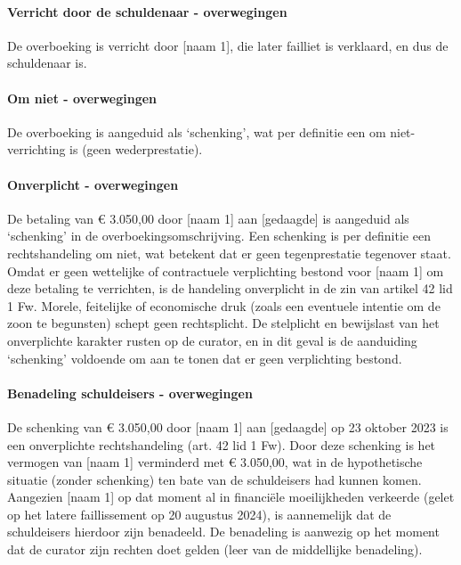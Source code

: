 \documentclass[
  dutch,
  a4paper,
]{article}
\begin{document}
\paragraph{Verricht door de schuldenaar - overwegingen}\label{verricht-door-de-schuldenaar---overwegingen-33}

De overboeking is verricht door {[}naam 1{]}, die later failliet is verklaard, en dus de schuldenaar is.

\paragraph{Om niet - overwegingen}\label{om-niet---overwegingen-33}

De overboeking is aangeduid als `schenking', wat per definitie een om niet-verrichting is (geen wederprestatie).

\paragraph{Onverplicht - overwegingen}\label{onverplicht---overwegingen-33}

De betaling van € 3.050,00 door {[}naam 1{]} aan {[}gedaagde{]} is aangeduid als `schenking' in de overboekingsomschrijving. Een schenking is per definitie een rechtshandeling om niet, wat betekent dat er geen tegenprestatie tegenover staat. Omdat er geen wettelijke of contractuele verplichting bestond voor {[}naam 1{]} om deze betaling te verrichten, is de handeling onverplicht in de zin van artikel 42 lid 1 Fw. Morele, feitelijke of economische druk (zoals een eventuele intentie om de zoon te begunsten) schept geen rechtsplicht. De stelplicht en bewijslast van het onverplichte karakter rusten op de curator, en in dit geval is de aanduiding `schenking' voldoende om aan te tonen dat er geen verplichting bestond.

\paragraph{Benadeling schuldeisers - overwegingen}\label{benadeling-schuldeisers---overwegingen-33}

De schenking van € 3.050,00 door {[}naam 1{]} aan {[}gedaagde{]} op 23 oktober 2023 is een onverplichte rechtshandeling (art. 42 lid 1 Fw). Door deze schenking is het vermogen van {[}naam 1{]} verminderd met € 3.050,00, wat in de hypothetische situatie (zonder schenking) ten bate van de schuldeisers had kunnen komen. Aangezien {[}naam 1{]} op dat moment al in financiële moeilijkheden verkeerde (gelet op het latere faillissement op 20 augustus 2024), is aannemelijk dat de schuldeisers hierdoor zijn benadeeld. De benadeling is aanwezig op het moment dat de curator zijn rechten doet gelden (leer van de middellijke benadeling).
\end{document}
